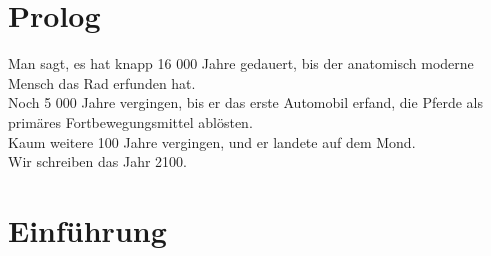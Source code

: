 \section{Prolog}

Man sagt, es hat knapp 16 000 Jahre gedauert, bis der anatomisch moderne Mensch das Rad erfunden hat. \\
Noch 5 000 Jahre vergingen, bis er das erste Automobil erfand, die Pferde als primäres Fortbewegungsmittel ablösten. \\
Kaum weitere 100 Jahre vergingen, und er landete auf dem Mond. \\

Wir schreiben das Jahr 2100. 



\section{Einführung}
